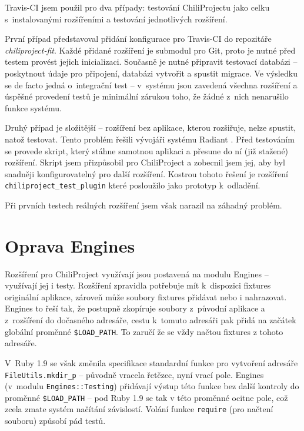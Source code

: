 \documentclass[thesis=B,czech]{FITthesis}[2012/05/02]
\begin{document}
Travis-CI jsem použil pro dva případy: testování ChiliProjectu jako
celku s~instalovanými rozšířeními a testování jednotlivých
rozšíření.

První případ představoval přidání konfigurace pro Travis-CI do
repozitáře \emph{chiliproject-fit}. Každé přidané rozšíření je
\gls{submodul} pro Git, proto je nutné před testem provést jejich
inicializaci. Současně je nutné připravit testovací databázi --
poskytnout údaje pro připojení, databázi vytvořit a spustit migrace. Ve
výsledku se de facto jedná o~integrační test -- v~systému jsou zavedená
všechna rozšíření a úspěšné provedení testů je minimální zárukou toho,
že žádné z~nich nenarušilo funkce systému.

Druhý případ je složitější -- rozšíření bez aplikace, kterou rozšiřuje,
nelze spustit, natož testovat. Tento problém řešili vývojáři systému
Radiant \citep{Muhl2012}. Před testováním se provede skript, který
stáhne samotnou aplikaci a přesune do ní (již stažené) rozšíření. Skript
jsem přizpůsobil pro ChiliProject a zobecnil jsem jej, aby byl snadněji
konfigurovatelný pro další rozšíření. Kostrou tohoto řešení je rozšíření
\lstinline!chiliproject_test_plugin! které posloužilo jako prototyp
k~odladění.

Při prvních testech reálných rozšíření jsem však narazil na záhadný
problém.

\section{Oprava Engines}
\label{sec:oprava-engines}

Rozšíření pro ChiliProject využívají jsou postavená na modulu Engines --
využívají jej i testy. Rozšíření zpravidla potřebuje mít k~dispozici
\gls{fixtures} originální aplikace, zároveň může soubory fixtures
přidávat nebo i nahrazovat. Engines to řeší tak, že postupně zkopíruje
soubory z~původní aplikace a z~rozšíření do dočasného adresáře, cestu
k~tomuto adresáři pak přidá na začátek globální proměnné
\lstinline!$LOAD_PATH!. To zaručí že se vždy načtou fixtures z tohoto
adresáře.

V~Ruby 1.9 se však změnila specifikace standardní funkce pro vytvoření
adresáře \lstinline!FileUtils.mkdir_p! -- původně vracela řetězec, nyní
vrací pole. Engines (v~modulu \lstinline!Engines::Testing!) přidávají
výstup této funkce bez další kontroly do proměnné \lstinline!$LOAD_PATH!
-- pod Ruby 1.9 se tak v této proměnné ocitne pole, což zcela zmate
systém načítání závislostí. Volání funkce \lstinline!require! (pro
načtení souboru) způsobí pád testů.
\end{document}
